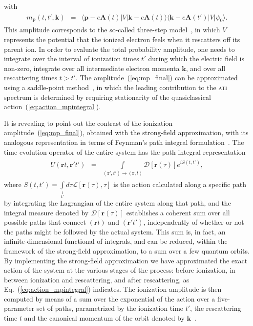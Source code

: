 %
with
%
\begin{eqnarray}
  \label{eq:mp_braketfunction}
  \begin{split}
    m_{\mathbf{p}}(t, t', \mathbf{k}) & = &
    \langle \mathbf{p} - e\mathbf{A}(t) | V |
    \mathbf{k} - e\mathbf{A}(t) \rangle 
    \langle \mathbf{k} - e\mathbf{A}(t') | V |
    \psi_{0} \rangle.
  \end{split}
\end{eqnarray}
%
This amplitude corresponds to the so-called three-step
model~\cite{Becker_ati2002}, in which $V$ represents the potential
that the ionized electron feels when it rescatters off its parent
ion. In order to evaluate the total probability amplitude, one needs
to integrate over the interval of ionization times $t'$ during which
the electric field is non-zero, integrate over all intermediate
electron momenta $\mathbf{k}$, and over all rescattering times $t >
t'$. The amplitude~(\ref{eq:mp_final}) can be approximated using a
saddle-point method~\cite{Lewenstein_1995}, in which the leading
contribution to the \textsc{ati} spectrum is determined by requiring
stationarity of the quasiclassical
action~(\ref{eq:action_mpintegral}).


It is revealing to point out the contrast of the ionization
amplitude~(\ref{eq:mp_final}), obtained with the strong-field
approximation, with its analogous representation in terms of Feynman's
path integral formulation~\cite{RevModPhysFeynman}. The time evolution
operator of the entire system has the path integral representation
\begin{eqnarray}
\label{eq:te_path}
\begin{split}
U(\mathbf{r}t, \mathbf{r}'t') & = &
\int\limits_{(\mathbf{r}',t')\to(\mathbf{r},t)}
\mathcal{D}\left[ \mathbf{r}(\tau) \right] e^{i S(t, t')},
\end{split}
\end{eqnarray}
where $S(t, t') = \int\limits_{t'}\limits^{t} d\tau
\mathcal{L}[\mathbf{r}(\tau), \tau]$ is the action calculated along a
specific path by integrating the Lagrangian of the entire system along
that path, and the integral measure denoted by $\mathcal{D}\left[
  \mathbf{r}(\tau) \right]$ establishes a coherent sum over all
possible paths that connect $(\mathbf{r}t)$ and $(\mathbf{r}'t')$,
independently of whether or not the paths might be followed by the
actual system. This sum is, in fact, an infinite-dimensional
functional of integrals, and can be reduced, within the framework of
the strong-field approximation, to a sum over a few quantum orbits. By
implementing the strong-field approximation we have approximated the
exact action of the system at the various stages of the process:
before ionization, in between ionization and rescattering, and after
rescattering, as Eq.~(\ref{eq:action_mpintegral}) indicates. The
ionization amplitude is then computed by means of a sum over the
exponential of the action over a five-parameter set of paths,
parametrized by the ionization time $t'$, the rescattering time $t$
and the canonical momentum of the orbit denoted by
$\mathbf{k}$~\cite{KopoldOptComm2000}.


